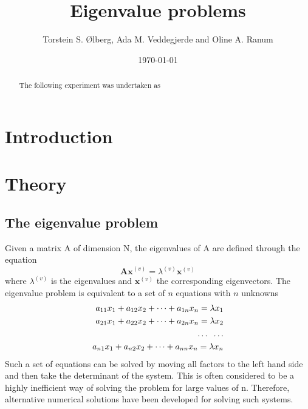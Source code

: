 \documentclass[%
reprint,
amsmath,amssymb,
aps,
]{revtex4-1}
\begin{document}
\title{Eigenvalue problems}
\author{Torstein S. Ølberg, Ada M. Veddegjerde and Oline A. Ranum}
\date{\today}


\begin{abstract}
	The following experiment was undertaken as
\end{abstract}
\maketitle

\section*{Introduction}


\section*{Theory}
\subsection{The eigenvalue problem} \noindent 
Given a matrix A of dimension N, the eigenvalues of A are defined through the equation
\begin{equation}\label{eigenval}
	\mathbf{Ax}^{(v)} = \lambda^{(v)}\mathbf{x}^{(v)}
\end{equation}
where $\lambda^{(v)}$ is the eigenvalues and $\mathbf{x}^{(v)}$ the corresponding eigenvectors. The eigenvalue problem is equivalent to a set of $n$ equations with $n$ unknowns 
\begin{align*}
	a_{11}x_1 + a_{12}x_2 +\dots + a_{1n}x_n = \lambda x_1 \\a_{21}x_1 + a_{22}x_2 +\dots + a_{2n}x_n = \lambda x_2 \\ \dots \hspace{2mm} \dots \\
	a_{n1}x_1 + a_{n2}x_2 +\dots + a_{nn}x_n = \lambda x_n \\
\end{align*}
Such a set of equations can be solved by moving all factors to the left hand side and then take the determinant of the system. This is often considered to be a highly inefficient way of solving the problem for large values of n. Therefore, alternative numerical solutions have been developed for solving such systems. 
\end{document}
